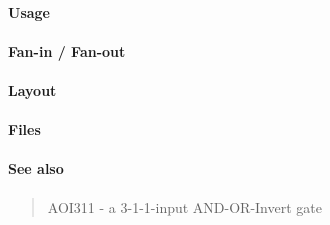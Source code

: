 \paragraph{Usage}

\paragraph{Fan-in / Fan-out}

\paragraph{Layout}

\paragraph{Files}

\paragraph{See also}
\begin{quote}
    AOI311 - a 3-1-1-input AND-OR-Invert gate
\end{quote}
